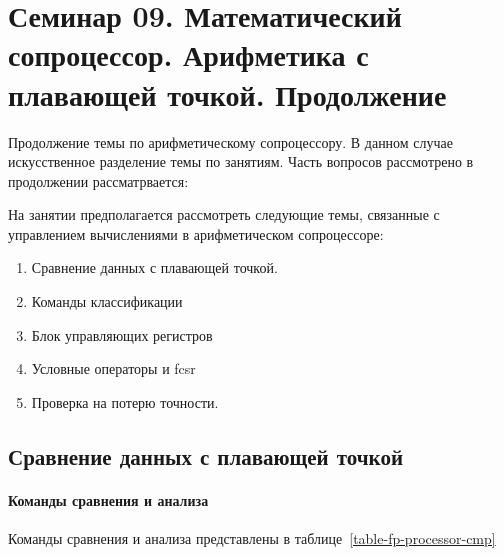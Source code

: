 \chapter[Арифметика с плавающей точкой. Продолжение]{Семинар 09. Математический сопроцессор. Арифметика с плавающей точкой. Продолжение }

Продолжение темы по арифметическому сопроцессору. В данном случае искусственное разделение темы по занятиям. Часть вопросов рассмотрено в продолжении рассматрвается:

На занятии предполагается рассмотреть следующие темы, связанные с управлением вычислениями в арифметическом сопроцессоре:
\begin{enumerate}
    \item Сравнение данных с плавающей точкой.
    \item Команды классификации
    \item Блок управляющих регистров
    \item Условные операторы и fcsr
    \item Проверка на потерю точности.
\end{enumerate}

\section{Сравнение данных с плавающей точкой}

\subsubsection{Команды сравнения и анализа}
Команды сравнения и анализа представлены в таблице~\ref{table-fp-processor-cmp}

